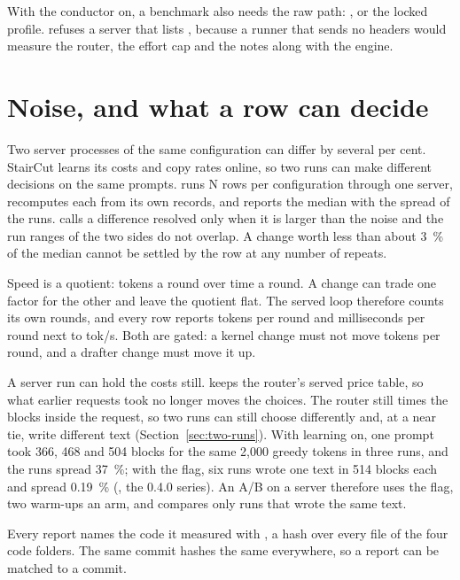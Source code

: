 With the conductor on, a benchmark also needs the raw path: , or the locked  profile.  refuses a server that lists , because a runner that sends no headers would measure the router, the effort cap and the notes along with the engine.

\section{Noise, and what a row can decide}

Two server processes of the same configuration can differ by several per cent. StairCut learns its costs and copy rates online, so two runs can make different decisions on the same prompts.  runs N rows per configuration through one server, recomputes each from its own records, and reports the median with the spread of the runs.  calls a difference resolved only when it is larger than the noise and the run ranges of the two sides do not overlap. A change worth less than about 3~\% of the median cannot be settled by the row at any number of repeats.

Speed is a quotient: tokens a round over time a round. A change can trade one factor for the other and leave the quotient flat. The served loop therefore counts its own rounds, and every row reports tokens per round and milliseconds per round next to tok/s. Both are gated: a kernel change must not move tokens per round, and a drafter change must move it up.

A server run can hold the costs still.  keeps the router's served price table, so what earlier requests took no longer moves the choices. The router still times the blocks inside the request, so two runs can still choose differently and, at a near tie, write different text (Section~\ref{sec:two-runs}). With learning on, one prompt took 366, 468 and 504 blocks for the same 2,000 greedy tokens in three runs, and the runs spread 37~\%; with the flag, six runs wrote one text in 514 blocks each and spread 0.19~\% (\measured, the 0.4.0 series). An A/B on a server therefore uses the flag, two warm-ups an arm, and compares only runs that wrote the same text.

Every report names the code it measured with , a hash over every file of the four code folders. The same commit hashes the same everywhere, so a report can be matched to a commit.

